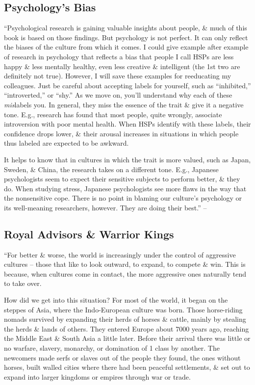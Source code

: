 \documentclass{article}
\numberwithin{equation}{section}
\begin{document}
\subsection{Psychology's Bias}
``Psychological research is gaining valuable insights about people, \& much of this book is based on those findings. But psychology is not perfect. It can only reflect the biases of the culture from which it comes. I could give example after example of research in psychology that reflects a bias that people I call HSPs are less happy \& less mentally healthy, even less creative \& intelligent (the 1st two are definitely not true). However, I will save these examples for reeducating my colleagues. Just be careful about accepting labels for yourself, such as ``inhibited,'' ``introverted,'' or ``shy.'' As we move on, you'll understand why each of these \textit{mis}labels you. In general, they miss the essence of the trait \& give it a negative tone. E.g., research has found that most people, quite wrongly, associate introversion with poor mental health. When HSPs identify with these labels, their confidence drops lower, \& their arousal increases in situations in which people thus labeled are expected to be awkward.

It helps to know that in cultures in which the trait is more valued, such as Japan, Sweden, \& China, the research takes on a different tone. E.g., Japanese psychologists seem to expect their sensitive subjects to perform better, \& they do. When studying stress, Japanese psychologists see more flaws in the way that the nonsensitive cope. There is no point in blaming our culture's psychology or its well-meaning researchers, however. They are doing their best.'' -- \cite[pp. 50--51]{Aron2013}

\subsection{Royal Advisors \& Warrior Kings}
``For better \& worse, the world is increasingly under the control of aggressive cultures -- those that like to look outward, to expand, to compete \& win. This is because, when cultures come in contact, the more aggressive ones naturally tend to take over.

How did we get into this situation? For most of the world, it began on the steppes of Asia, where the Indo-European culture was born. Those horse-riding nomads survived by expanding their herds of horses \& cattle, mainly by stealing the herds \& lands of others. They entered Europe about 7000 years ago, reaching the Middle East \& South Asia a little later. Before their arrival there was little or no warfare, slavery, monarchy, or domination of 1 class by another. The newcomers made serfs or slaves out of the people they found, the ones without horses, built walled cities where there had been peaceful settlements, \& set out to expand into larger kingdoms or empires through war or trade.
\end{document}
